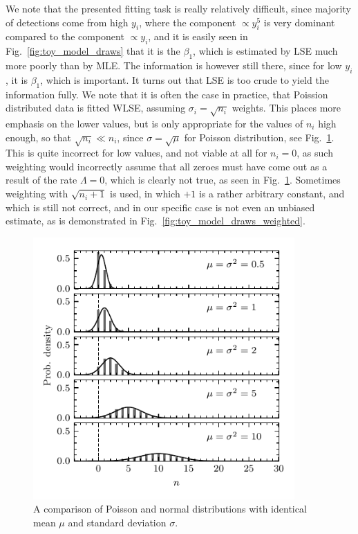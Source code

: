 We note that the presented fitting task is really relatively difficult, since majority of detections come from high $y_i$, where the component $\propto y_i^5$ is very dominant compared to the component $\propto y_i$, and it is easily seen in Fig.~\ref{fig:toy_model_draws} that it is the $\beta_1$, which is estimated by LSE much more poorly than by MLE. The information is however still there, since for low $y_i$, it is $\beta_1$, which is important. It turns out that LSE is too crude to yield the information fully. We note that it is often the case in practice, that Poission distributed data is fitted WLSE, assuming $\sigma_i = \sqrt{n_i}$ weights. This places more emphasis on the lower values, but is only appropriate for the values of $n_i$ high enough, so that $\sqrt{n_i} \ll n_i$, since $\sigma = \sqrt{\mu}$ for Poisson distribution, see Fig.~\ref{fig:pois_vs_norm}. This is quite incorrect for low values, and not viable at all for $n_i = 0$, as such weighting would incorrectly assume that all zeroes must have come out as a result of the rate $\Lambda = 0$, which is clearly not true, as seen in Fig.~\ref{fig:pois_vs_norm}. Sometimes weighting with $\sqrt{n_i+1}$ is used, in which $+1$ is a rather arbitrary constant, and which is still not correct, and in our specific case is not even an unbiased estimate, as is demonstrated in Fig.~\ref{fig:toy_model_draws_weighted}. 

\begin{figure}[h]
 	\centering
 	\includegraphics[width=10cm]{figures/pois_vs_norm.pdf}
 	\caption{A comparison of Poisson and normal distributions with identical mean $\mu$ and standard deviation $\sigma$.}
 	\label{fig:pois_vs_norm}
\end{figure}

